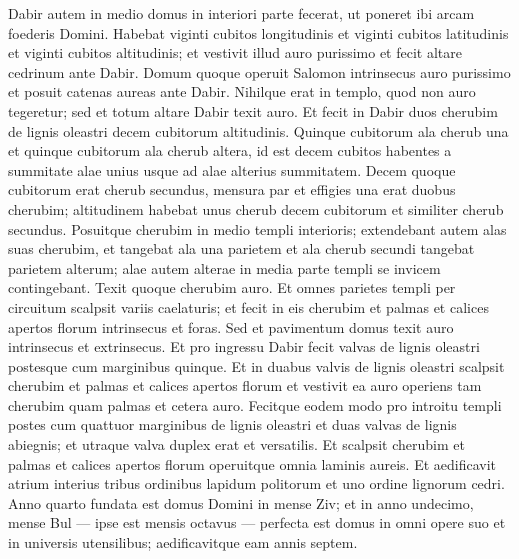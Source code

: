 \begin{biblechapter}
\verse Dabir autem in medio domus in interiori parte fecerat, ut poneret ibi arcam foederis Domini. 
\verse Habebat viginti cubitos longitudinis et viginti cubitos latitudinis et viginti cubitos altitudinis; et vestivit illud auro purissimo et fecit altare cedrinum ante Dabir. 
\verse Domum quoque operuit Salomon intrinsecus auro purissimo et posuit catenas aureas ante Dabir. 
\verse Nihilque erat in templo, quod non auro tegeretur; sed et totum altare Dabir texit auro. 
\verse Et fecit in Dabir duos cherubim de lignis oleastri decem cubitorum altitudinis. 
\verse Quinque cubitorum ala cherub una et quinque cubitorum ala cherub altera, id est decem cubitos habentes a summitate alae unius usque ad alae alterius summitatem. 
\verse Decem quoque cubitorum erat cherub secundus, mensura par et effigies una erat duobus cherubim; 
\verse altitudinem habebat unus cherub decem cubitorum et similiter cherub secundus. 
\verse Posuitque cherubim in medio templi interioris; extendebant autem alas suas cherubim, et tangebat ala una parietem et ala cherub secundi tangebat parietem alterum; alae autem alterae in media parte templi se invicem contingebant. 
\verse Texit quoque cherubim auro. 
\verse Et omnes parietes templi per circuitum scalpsit variis caelaturis; et fecit in eis cherubim et palmas et calices apertos florum intrinsecus et foras. 
\verse Sed et pavimentum domus texit auro intrinsecus et extrinsecus. 
\verse Et pro ingressu Dabir fecit valvas de lignis oleastri postesque cum marginibus quinque. 
\verse Et in duabus valvis de lignis oleastri scalpsit cherubim et palmas et calices apertos florum et vestivit ea auro operiens tam cherubim quam palmas et cetera auro. 
\verse Fecitque eodem modo pro introitu templi postes cum quattuor marginibus de lignis oleastri 
\verse et duas valvas de lignis abiegnis; et utraque valva duplex erat et versatilis. 
\verse Et scalpsit cherubim et palmas et calices apertos florum operuitque omnia laminis aureis. 
\verse Et aedificavit atrium interius tribus ordinibus lapidum politorum et uno ordine lignorum cedri. 
\verse Anno quarto fundata est domus Domini in mense Ziv; 
\verse et in anno undecimo, mense Bul — ipse est mensis octavus — perfecta est domus in omni opere suo et in universis utensilibus; aedificavitque eam annis septem. 
\end{biblechapter}

